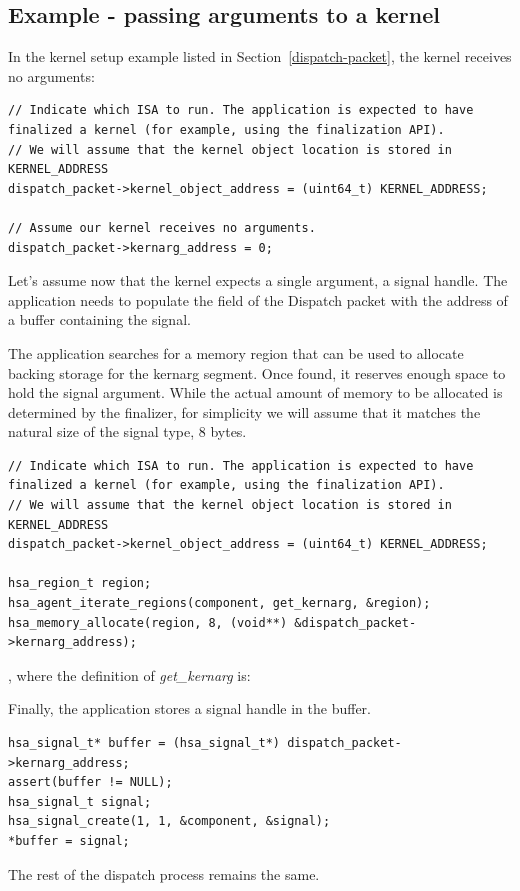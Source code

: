 \documentclass[final]{book}
\begin{document}
\subsection{Example - passing arguments to a kernel}\label{ex:kernarg_dispatch}
In the kernel setup example listed in Section~\ref{dispatch-packet}, the kernel
receives no arguments:
\begin{lstlisting}
// Indicate which ISA to run. The application is expected to have finalized a kernel (for example, using the finalization API).
// We will assume that the kernel object location is stored in KERNEL_ADDRESS
dispatch_packet->kernel_object_address = (uint64_t) KERNEL_ADDRESS;

// Assume our kernel receives no arguments.
dispatch_packet->kernarg_address = 0;
\end{lstlisting}
Let's assume now that the kernel expects a single argument, a signal handle. The
application needs to populate the 
field of the Dispatch packet with the address of a buffer containing the signal.

The application searches for a memory region that can be used to allocate
backing storage for the kernarg segment. Once found, it reserves enough space to
hold the signal argument. While the actual amount of memory to be allocated is
determined by the finalizer, for simplicity we will assume that it matches the
natural size of the signal type, 8 bytes.
\begin{lstlisting}
// Indicate which ISA to run. The application is expected to have finalized a kernel (for example, using the finalization API).
// We will assume that the kernel object location is stored in KERNEL_ADDRESS
dispatch_packet->kernel_object_address = (uint64_t) KERNEL_ADDRESS;

hsa_region_t region;
hsa_agent_iterate_regions(component, get_kernarg, &region);
hsa_memory_allocate(region, 8, (void**) &dispatch_packet->kernarg_address);
\end{lstlisting}

, where the definition of \textit{get_kernarg} is:


Finally, the application stores a signal handle in the buffer.
\begin{lstlisting}
hsa_signal_t* buffer = (hsa_signal_t*) dispatch_packet->kernarg_address;
assert(buffer != NULL);
hsa_signal_t signal;
hsa_signal_create(1, 1, &component, &signal);
*buffer = signal;
\end{lstlisting}
The rest of the dispatch process remains the same.
\end{document}
